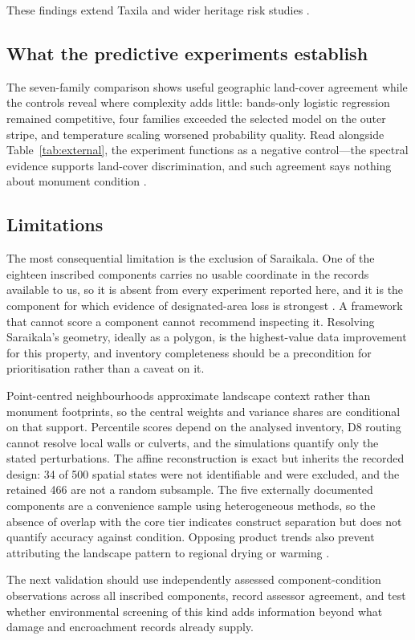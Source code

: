 These findings extend Taxila and wider heritage risk studies \citep{khan2022taxila,guerriero2022derwent,romao2022risk,yang2023yongtai,megarry2026landcover}.

\subsection{What the predictive experiments establish}
The seven-family comparison shows useful geographic land-cover agreement while
the controls reveal where complexity adds little: bands-only logistic regression
remained competitive, four families exceeded the selected model on the outer
stripe, and temperature scaling worsened probability quality. Read alongside
Table~\ref{tab:external}, the experiment functions as a negative control---the
spectral evidence supports land-cover discrimination, and such agreement says
nothing about monument condition
\citep{hijmans2012cv,meyer2018target,meyer2021aoa,ploton2020spatial}.

\subsection{Limitations}
The most consequential limitation is the exclusion of Saraikala. One of the
eighteen inscribed components carries no usable coordinate in the records
available to us, so it is absent from every experiment reported here, and it is
the component for which evidence of designated-area loss is strongest
\citep{butt2025taxila}. A framework that cannot score a component cannot
recommend inspecting it. Resolving Saraikala's geometry, ideally as a polygon, is
the highest-value data improvement for this property, and inventory completeness
should be a precondition for prioritisation rather than a caveat on it.

Point-centred neighbourhoods approximate landscape context rather than monument
footprints, so the central weights and variance shares are conditional on that
support. Percentile scores depend on the analysed inventory, D8 routing cannot
resolve local walls or culverts, and the simulations quantify only the stated
perturbations. The affine reconstruction is exact but inherits the recorded
design: 34 of 500 spatial states were not identifiable and were excluded, and the
retained 466 are not a random subsample. The five externally documented
components are a convenience sample using heterogeneous methods, so the absence
of overlap with the core tier indicates construct separation but does not
quantify accuracy against condition. Opposing product trends also prevent
attributing the landscape pattern to regional drying or warming
\citep{sesana2021climate,daly2022adaptation}.

The next validation should use independently assessed component-condition
observations across all inscribed components, record assessor agreement, and test
whether environmental screening of this kind adds information beyond what damage
and encroachment records already supply.

